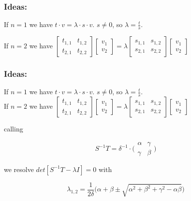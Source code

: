 \documentclass{beamer}
\theoremstyle{definition} \newtheorem{de}{Def}
\theoremstyle{remark} \newtheorem{os}[de]{Oss}
\theoremstyle{plain} \newtheorem{te}[de]{Teo}
\theoremstyle{plain} \newtheorem{co}[de]{Cor}
\theoremstyle{plain} \newtheorem{pr}[de]{Prop}
\theoremstyle{plain} \newtheorem{lem}[de]{Lemm}
\theoremstyle{remark} \newtheorem{rem}[de]{Remark}
\begin{document}
\begin{frame}
  \frametitle{Ideas:}
  If $n=1$ we have $t\cdot v=\lambda\cdot s\cdot v$. $s\ne 0$, so 
  $\lambda= \frac{t}{s}$.\\
  
  \pause
  
  If $n=2$ we have $\begin{bmatrix}t_{1,1}&t_{1,2}\\ t_{2,1} & t_{2,2}\end{bmatrix} \begin{bmatrix}v_{1} \\ v_{2}\end{bmatrix} = \lambda \begin{bmatrix}s_{1,1} & s_{1,2}\\ s_{2,1} & s_{2,2}\end{bmatrix} \begin{bmatrix}v_{1} \\ v_{2}\end{bmatrix}$


\end{frame}


\begin{frame}
  \frametitle{Ideas:}
  If $n=1$ we have $t\cdot v=\lambda\cdot s\cdot v$. $s\ne 0$, so 
  $\lambda= \frac{t}{s}$.\\
  
  If $n=2$ we have $\begin{bmatrix}t_{1,1}&t_{1,2}\\ t_{2,1} & t_{2,2}\end{bmatrix} \begin{bmatrix}v_{1} \\ v_{2}\end{bmatrix} = \lambda \begin{bmatrix}s_{1,1} & s_{1,2}\\ s_{2,1} & s_{2,2}\end{bmatrix} \begin{bmatrix}v_{1} \\ v_{2}\end{bmatrix}$
  
  
  calling 

  \begin{equation*}
    S^{-1}T = \delta^{-1} \cdot \Big( \begin{matrix} \alpha & \gamma \\ \gamma & \beta \end{matrix}\Big)
  \end{equation*}

  we resolve $det[ S^{-1}T - \lambda I ]=0$ with

  \begin{equation*}
    \lambda_{1,2} = \frac{1}{2\delta}  
  \big( \alpha+\beta \pm \sqrt{ \alpha^2 + \beta^2 + 
  \gamma^2 - \alpha\beta } \big)
  \end{equation*}

\end{frame}
\end{document}
